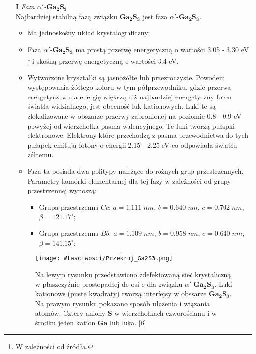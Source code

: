 \begin{enumerate}
	\item[\textbf{I}] \textit{Faza $\alpha'$-$\mathbf{Ga_{2}S_{3}}$} \\
	Najbardziej stabilną fazą związku $\mathbf{Ga_{2}S_{3}}$ jest faza $\alpha'$-$\mathbf{Ga_{2}S_{3}}$.
	\begin{itemize}
		\item Ma jednoskośny układ krystalograficzny;
		\item Faza $\alpha'$-$\mathbf{Ga_{2}S_{3}}$ ma prostą przerwę energetyczną o wartości 3.05 - 3.30 eV \footnote{W zależności od źródła.} i skośną przerwę energetyczną o wartości 3.4 eV.
		\item Wytworzone kryształki są jasnożółte lub przezroczyste. Powodem występowania żółtego koloru w tym półprzewodniku, gdzie przerwa energetyczna ma energię większą niż najbardziej energetyczny foton światła widzialnego, jest obecność luk kationowych. Luki te są zlokalizowane w obszarze przerwy zabronionej na poziomie 0.8 - 0.9 eV powyżej od wierzchołka pasma walencyjnego. Te luki tworzą pułapki elektronowe. Elektrony które przechodzą z pasma przewodnictwa do tych pułapek emitują fotony o energii 2.15 - 2.25 eV co odpowiada światłu żółtemu.
		\item Faza ta posiada dwa politypy należące do różnych grup przestrzennych. Parametry komórki elementarnej dla tej fazy w zależności od grupy przestrzennej wynoszą:
		\begin{itemize}
			\item Grupa przestrzenna $Cc$: $a=1.111\;nm$, $b=0.640\;nm$, $c=0.702\;nm$, $\beta=121.17^{\circ}$;
			\item Grupa przestrzenna $Bb$: $a=1.109\;nm$, $b=0.958\;nm$, $c=0.640\;nm$, $\beta=141.15^{\circ}$;
		\end{itemize}
	\end{itemize} 
	
	\begin{figure}[H]
		\begin{center}
			\texttt{[image: Wlasciwosci/Przekroj\_Ga2S3.png]}
			\caption{Na lewym rysunku przedstawiono zdefektowaną sieć krystaliczną w płaszczyźnie prostopadłej do osi c dla związku $\alpha'$-$\mathbf{Ga_{2}S_{3}}$. Luki kationowe (puste kwadraty) tworzą interfejsy w obszarze $\mathbf{Ga_{2}S_{3}}$. Na prawym rysunku pokazano sposób ułożenia i wiązania atomów. Cztery aniony $\mathbf{S}$ w wierzchołkach czworościanu i w środku jeden kation $\mathbf{Ga}$ lub luka. [6]}
		\end{center}
	\end{figure}
	

\end{enumerate}
